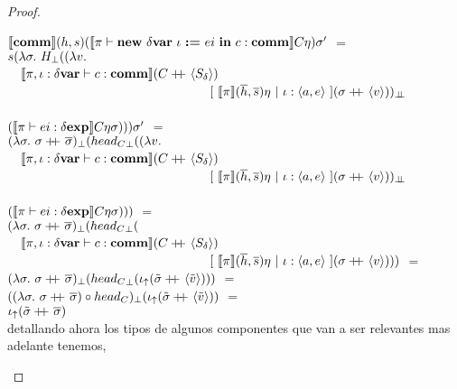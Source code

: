 \begin{proof}
\begin{itemize}
\begin{itemize}
$\llbracket \textbf{comm} \rrbracket(h,s)(\llbracket \pi \vdash \textbf{new} \ \delta \textbf{var} \ \iota \ \textbf{:=} \ ei \ \textbf{in} \ c : \textbf{comm} \rrbracket C\eta)\sigma'$ $=$\\
$s (\lambda \sigma . \ H_{\bot} ((\lambda v .$ \\
\indent \ \ 
	$\llbracket \pi,\iota:\delta \textbf{var} \vdash c : \textbf{comm} \rrbracket(C +\kern-1.3ex+\kern0.8ex \langle S_\delta \rangle)$\\
\indent \ \ \ \ \ \ \ \ \ \ \ \ \ \ \ \ \ \ \ \ \ \ \ \ \ \ \ \ \ \ \ \
			$[ \ \semBrcks{\pi}(\hover,\sover)\eta \ | \ \iota:\lrangles{a,e} \ ]
			(\sigma\concat \lrangles{v}))_{\dbot}$\\
\indent \ \ \ \ \ \ \ \ \ \ \ \ \ \ \ \ \ \ \ \ \ \ \ \ \ \ \ \ \ \ \ \ \ \ \ \ \ \ \ \ \ \ \ \ \
 \ \ \ \ \ \ \ \ \ \ \ \ \ \ \ \ \ \ \ \ \ \ \ \ \ \ \
		$(\llbracket \pi \vdash ei : \delta \textbf{exp} \rrbracket C\eta\sigma)) ) \sigma'$ $=$\\
$(\lambda \sigma . \ \sigma +\kern-1.3ex+\kern0.8ex \overline{\sigma})_{\bot}({head_{C}}_{\bot} ((\lambda v .$ \\
\indent \ \ 
	$\llbracket \pi,\iota:\delta \textbf{var} \vdash c : \textbf{comm} \rrbracket(C +\kern-1.3ex+\kern0.8ex \langle S_\delta \rangle)$\\
\indent \ \ \ \ \ \ \ \ \ \ \ \ \ \ \ \ \ \ \ \ \ \ \ \ \ \ \ \ \ \ \ \
			$[ \ \semBrcks{\pi}(\hover,\sover)\eta \ | \ \iota:\lrangles{a,e} \ ]
			(\sigma\concat \lrangles{v}))_{\dbot}$\\
\indent \ \ \ \ \ \ \ \ \ \ \ \ \ \ \ \ \ \ \ \ \ \ \ \ \ \ \ \ \ \ \ \ \ \ \ \ \ \ \ \ \ \ \ \ \
 \ \ \ \ \ \ \ \ \ \ \ \ \ \ \ \ \ \ \ \ \ \ \ \ \ \ \
		$(\llbracket \pi \vdash ei : \delta \textbf{exp} \rrbracket C\eta\sigma)))$ $=$\\
$(\lambda \sigma . \ \sigma +\kern-1.3ex+\kern0.8ex \overline{\sigma})_{\bot}({head_{C}}_{\bot} ($ \\
\indent \ \ 
	$\llbracket \pi,\iota:\delta \textbf{var} \vdash c : \textbf{comm} \rrbracket(C +\kern-1.3ex+\kern0.8ex \langle S_\delta \rangle)$\\
\indent \ \ \ \ \ \ \ \ \ \ \ \ \ \ \ \ \ \ \ \ \ \ \ \ \ \ \ \ \ \ \ \
			$[ \ \semBrcks{\pi}(\hover,\sover)\eta \ | \ \iota:\lrangles{a,e} \ ]
			(\sigma\concat \lrangles{v})))$ $=$\\
$(\lambda \sigma . \ \sigma +\kern-1.3ex+\kern0.8ex \overline{\sigma})_{\bot}
({head_{C}}_{\bot} (\iota_{\uparrow} (\tilde{\sigma} +\kern-1.3ex+\kern0.8ex \langle \tilde{v} \rangle)))$ $=$\\
$((\lambda \sigma . \ \sigma +\kern-1.3ex+\kern0.8ex \overline{\sigma}) \circ
head_{C})_{\bot} (\iota_{\uparrow} (\tilde{\sigma} +\kern-1.3ex+\kern0.8ex \langle \tilde{v} \rangle))$ $=$\\
$\iota_{\uparrow} (\tilde{\sigma} +\kern-1.3ex+\kern0.8ex \overline{\sigma})$\\

detallando ahora los tipos de algunos componentes que van a ser relevantes
mas adelante tenemos,\\


\end{itemize}
\end{itemize}
\end{proof}
